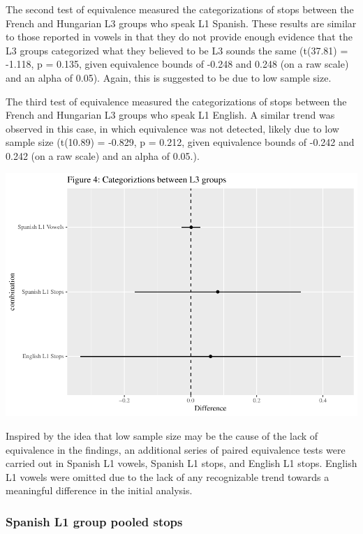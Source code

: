 \documentclass[
  english,
  man]{apa6}
\begin{document}
The second test of equivalence measured the categorizations of stops between the French and Hungarian L3 groups who speak L1 Spanish. These results are similar to those reported in vowels in that they do not provide enough evidence that the L3 groups categorized what they believed to be L3 sounds the same (t(37.81) = -1.118, p = 0.135, given equivalence bounds of -0.248 and 0.248 (on a raw scale) and an alpha of 0.05).
Again, this is suggested to be due to low sample size.

The third test of equivalence measured the categorizations of stops between the French and Hungarian L3 groups who speak L1 English. A similar trend was observed in this case, in which equivalence was not detected, likely due to low sample size (t(10.89) = -0.829, p = 0.212, given equivalence bounds of -0.242 and 0.242 (on a raw scale) and an alpha of 0.05.).

\includegraphics{master_files/figure-latex/unnamed-chunk-7-1.pdf}

Inspired by the idea that low sample size may be the cause of the lack of equivalence in the findings, an additional series of paired equivalence tests were carried out in Spanish L1 vowels, Spanish L1 stops, and English L1 stops. English L1 vowels were omitted due to the lack of any recognizable trend towards a meaningful difference in the initial analysis.

\hypertarget{spanish-l1-group-pooled-stops}{%
\subsubsection{Spanish L1 group pooled stops}\label{spanish-l1-group-pooled-stops}}
\end{document}
